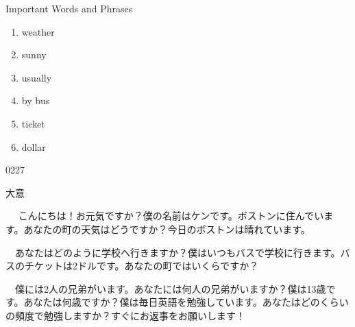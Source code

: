 \documentclass[aspectratio=169,xcolor={dvipsnames,table}]{beamer}
\begin{document}
\begin{frame}[plain]{Important Words and Phrases}
 
\large
\begin{enumerate}
 \item weather \hfill{}
 \item sunny \hfill{}
 \item usually \hfill{}
 \item by bus \hfill{}
 \item ticket \hfill{}
 \item dollar \hfill{}
\end{enumerate}

\hfill{\tiny 0227}\,{\scriptsize {}}

\end{frame}
\begin{frame}[plain]{大意}
 
\begin{tcolorbox}[title=ケンからの手紙]
　 こんにちは！お元気ですか？僕の名前はケンです。ボストンに住んでいます。あなたの町の天気はどうですか？今日のボストンは晴れています。

　あなたはどのように学校へ行きますか？僕はいつもバスで学校に行きます。バスのチケットは2ドルです。あなたの町ではいくらですか？

　僕には2人の兄弟がいます。あなたには何人の兄弟がいますか？僕は13歳です。あなたは何歳ですか？僕は毎日英語を勉強しています。あなたはどのくらいの頻度で勉強しますか？すぐにお返事をお願いします！
\end{tcolorbox}
\end{frame}
\end{document}
